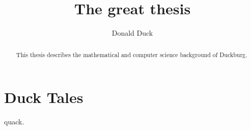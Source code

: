 \documentclass{kaumasters}
\title{The great thesis}
\author{Donald Duck}
\institute{Department of Mathematics and Computer Science}
\begin{document}
\maketitle
\frontmatter
\begin{abstract}
  This thesis describes the mathematical and computer science
  background of Duckburg.
\end{abstract}
\tableofcontents
\mainmatter
\section{Duck Tales}
quack.
\end{document}
